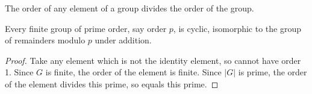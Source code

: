 \begin{corollary}
The order of any element of a group divides the order of the group.
\end{corollary}

\begin{corollary}
Every finite group of prime order, say order \(p\), is cyclic, isomorphic to the group of remainders modulo \(p\) under addition.
\end{corollary}
\begin{proof}
Take any element which is not the identity element, so cannot have order 1.
Since \(G\) is finite, the order of the element is finite.
Since \(|G|\) is prime, the order of the element divides this prime, so equals this prime.
\end{proof}



